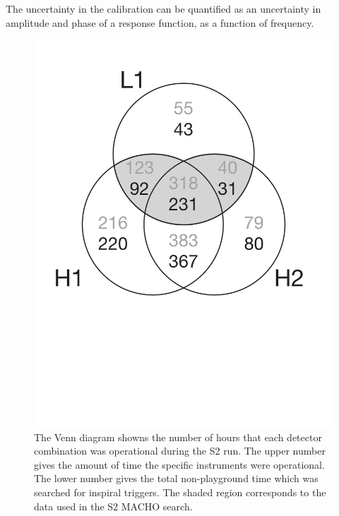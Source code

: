 The uncertainty in the calibration can be quantified as an uncertainty in
amplitude and phase of a response function, as a function of frequency.



\newpage

\begin{figure}[p]
\begin{center}
\includegraphics[width=\linewidth]{figures/result/s2_times}
\end{center}
\caption[Amounts of Single and Coincident Interferometer Data in S2]{%
\label{f:S2times}
The Venn diagram showns the number of hours that each detector combination was
operational during the S2 run.  The upper number gives the amount of time the
specific instruments were operational.  The lower number gives the total
non-playground time which was searched for inspiral triggers.  The shaded
region corresponds to the data used in the S2 MACHO search.}
\end{figure}

